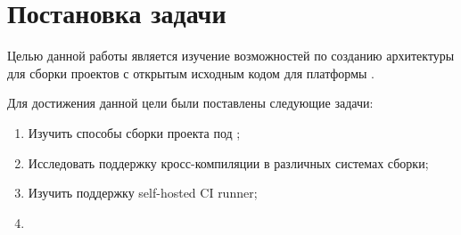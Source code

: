 
\section{Постановка задачи}
\label{sec:task}

Целью данной работы является изучение возможностей по созданию архитектуры для сборки проектов с открытым исходным кодом для платформы \riscv{}.

Для достижения данной цели были поставлены следующие задачи:
\begin{enumerate}
	\item Изучить способы сборки проекта под \riscv{};
	\item Исследовать поддержку кросс-компиляции в различных системах сборки;
	\item Изучить поддержку self-hosted CI runner;
	\item {}
\end{enumerate}
